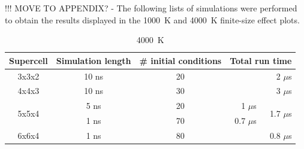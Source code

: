 %
\pagebreak
%


!!! MOVE TO APPENDIX? - The following lists of simulations were performed to obtain the results displayed in the 1000~K and 4000~K finite-size effect plots.

\begin{table}[h]

\centering
\caption[CONTENTS1]{4000~K}%

\begin{tabular}{cccrr}
Supercell                        & Simulation length & \# initial conditions & \multicolumn{2}{c}{Total run time}           \\ \hline
3x3x2                             & 10 ns                     & 20                             & \multicolumn{2}{r}{2 $\mu$s}   \\ \hline
4x4x3                             & 10 ns                     & 30                             & \multicolumn{2}{r}{3 $\mu$s}               \\ \hline
\multirow{2}{*}{5x5x4} & 5 ns                       & 20                             & 1 $\mu$s     & \multirow{2}{*}{1.7 $\mu$s} \\
                                       & 1 ns                       & 70                              & 0.7 $\mu$s &                               \\ \hline
6x6x4                            & 1 ns                       & 80                              & \multicolumn{2}{r}{0.8 $\mu$s}            
\end{tabular}

\label{tab:gk_fse_times_4K}
\end{table}




